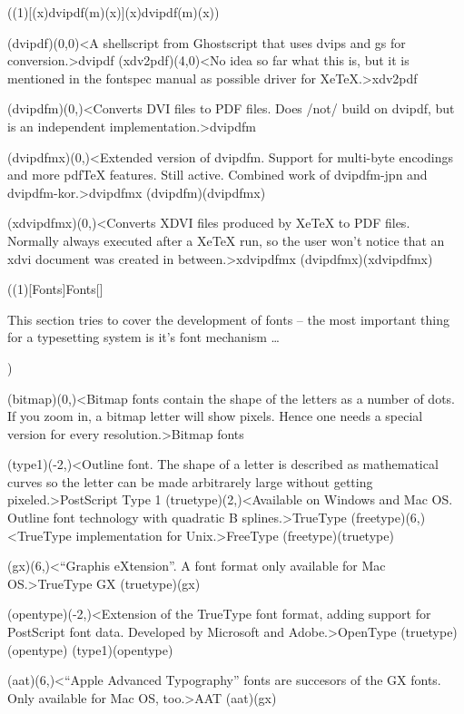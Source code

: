 \tograph(\tostruct(1)[{(x)dvipdf(m)(x)}]{(x)dvipdf(m)(x)}){
	\tonode(dvipdf)(0,0)<A shellscript from Ghostscript that uses dvips and gs for conversion.>{dvipdf}
	\tonode(xdv2pdf)(4,0)<No idea so far what this is, but it is mentioned in the fontspec manual as possible driver for XeTeX.>{xdv2pdf}
	\steplayer

	\tonode(dvipdfm)(0,\layer)<Converts DVI files to PDF files. Does /not/ build on dvipdf, but is an independent implementation.>{dvipdfm}
	\steplayer

	\tonode(dvipdfmx)(0,\layer)<Extended version of dvipdfm. Support for multi-byte encodings and more pdfTeX features. Still active. Combined work of dvipdfm-jpn and dvipdfm-kor.>{dvipdfmx}
	\todraw(dvipdfm)(dvipdfmx)
	\steplayer

	\tonode(xdvipdfmx)(0,\layer)<Converts XDVI files produced by XeTeX to PDF files. Normally always executed after a XeTeX run, so the user won't notice that an xdvi document was created in between.>{xdvipdfmx}
	\todraw(dvipdfmx)(xdvipdfmx)
}

\tograph(\tostruct(1)[Fonts]{Fonts}[\fonttechnology]
\parbox{\textwidth}{\large
This section tries to cover the development of fonts – the most important thing for a typesetting system is it's font mechanism …\\[4ex]}
){
	\tonode(bitmap)(0,\layer)<Bitmap fonts contain the shape of the letters as a number of dots. If you zoom in, a bitmap letter will show pixels. Hence one needs a special version for every resolution.>{Bitmap fonts}
	\steplayer[-3]

	\tonode(type1)(-2,\layer)<Outline font. The shape of a letter is described as mathematical curves so the letter can be made arbitrarely large without getting pixeled.>{PostScript Type 1}
	\tonode(truetype)(2,\layer)<Available on Windows and Mac OS. Outline font technology with quadratic B splines.>{TrueType}
	\tonode(freetype)(6,\layer)<TrueType implementation for Unix.>{FreeType}
	\todraw(freetype)(truetype)
	\steplayer[-3]

	\tonode(gx)(6,\layer)<“Graphis eXtension”. A font format only available for Mac OS.>{TrueType GX}
	\todraw(truetype)(gx)
	\steplayer[-3]

	\tonode(opentype)(-2,\layer)<Extension of the TrueType font format, adding support for PostScript font data. Developed by Microsoft and Adobe.>{OpenType}
	\todraw(truetype)(opentype)
	\todraw(type1)(opentype)

	\tonode(aat)(6,\layer)<“Apple Advanced Typography” fonts are succesors of the GX fonts. Only available for Mac OS, too.>{AAT}
	\todraw(aat)(gx)
}

